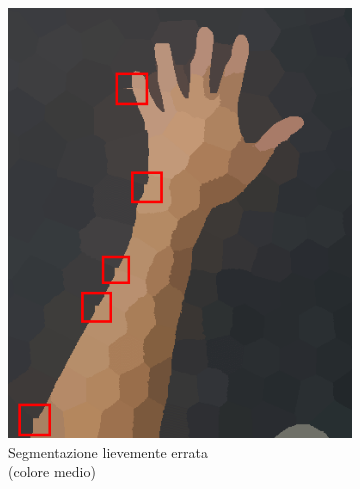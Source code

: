 \documentclass[12pt,a4paper,oneside]{article}
\begin{document}
\begin{figure}[!htb]
\begin{subfigure}[t]{.325\textwidth}
		\includegraphics[width=\textwidth]{resources/images/drifting300b.png}
		\captionsetup{justification=centering}
		\caption{Segmentazione lievemente errata\\(colore medio)}\label{es_drifting_300b}
	\end{subfigure}%
	\hfill
	\begin{subfigure}[t]{.325\textwidth}

\end{subfigure}
\end{figure}
\end{document}
